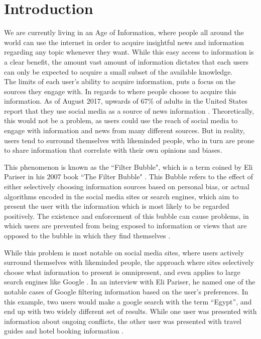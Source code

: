 \chapter{Introduction}
We are currently living in an Age of Information, where people all around
the world can use the internet in order to acquire insightful news and
information regarding any topic whenever they want. While this easy access to
information is a clear benefit, the amount vast amount of information dictates
that each users can only be expected to acquire a small subset of the available
knowledge.\\
The limits of each user's ability to acquire information, puts a focus on the
sources they engage with. In regards to where people choose to acquire this
information. As of August 2017, upwards of 67\% of adults in the United States
report that they use social media as a source of news information
\citep{journalism2017}. Theoretically, this would not be a problem, as users
could use the reach of social media to engage with information and news from
many different sources. But in reality, users tend to surround themselves with
likeminded people, who in turn are prone to share information that correlate
with their own opinions and biases.\nl

This phenomenon is known as the ``Filter Bubble", which is a term coined by Eli
Pariser in his 2007 book ``The Filter Bubble" \citep{pariser2011filter}. This
Bubble refers to the effect of either selectively choosing information sources
based on personal bias, or actual algorithms encoded in the social media sites
or search engines, which aim to present the user with the information which is
most likely to be regarded positively. The existence and enforcement of this
bubble can cause problems, in which users are prevented from being exposed to
information or views that are opposed to the bubble in which they find
themselves \citep[p.59-73]{pariser2011filter}.\nl

While this problem is most notable on social media sites, where users actively
surround themselves with likeminded people, the approach where sites selectively
choose what information to present is omnipresent, and even applies to large
search engines like Google \citep{filterBubbleDef}. In an interview with Eli
Pariser, he named one of the notable cases of Google filtering information based
on the user's preferences. In this example, two users would make a google search
with the term ``Egypt'', and end up with two widely different set of results.
While one user was presented with information about ongoing conflicts, the
other user was presented with travel guides and hotel booking information
\citep{nusSduSearch}.
